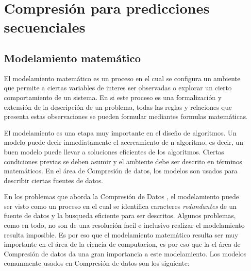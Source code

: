 \uncm
\section{Compresión para predicciones secuenciales}


\uncm



\subsection{Modelamiento matemático}

El modelamiento matemático es un proceso en el cual se configura un ambiente que permite a ciertas variables de interes ser observadas o explorar un cierto comportamiento  de un sistema. En si este proceso es una formalización y extensión de la descripción de un problema, todas las reglas y relaciones que presenta estas observaciones se pueden formular mediantes formulas matemáticas.

El modelamiento es una etapa muy importante en el diseño de algoritmos. Un modelo puede decir inmediatamente el acercamiento de n algoritmo, es decir, un  buen modelo puede llevar a soluciones eficientes de los algoritmos. Ciertas condiciones previas se deben asumir y el ambiente debe ser descrito  en términos matemáticos. En el área de Compresión de datos, los modelos son usados para describir ciertas fuentes de datos.



En los problemas que aborda la Compresión de Datos , el modelamiento puede ser visto como un proceso en el cual se identifica caracteres \emph{redundantes} de un fuente de datos y la busqueda eficiente para ser descritos. Algunos problemas, como en todo, no son de una resolución facil e inclusivo realizar el modelamiento resulta imposible. Es por eso que el modelamiento matemático resulta ser muy importante en el área de la ciencia de computacion, es por eso que la el área de Compresión de datos da una gran importancia a este modelamiento. Los modelos comunmente usados en Compresión de datos son los siguiente:

